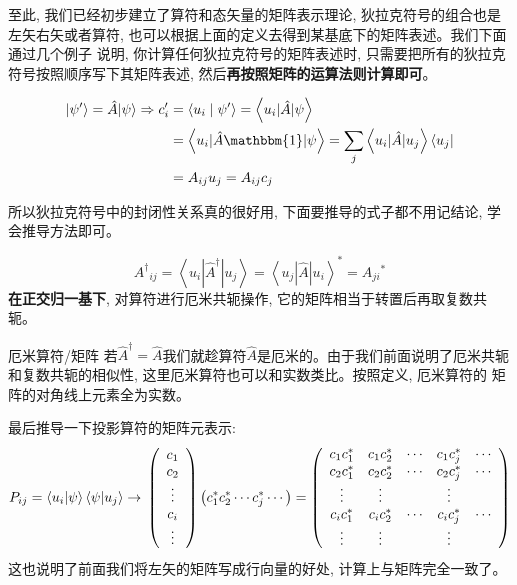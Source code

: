 至此, 我们已经初步建立了算符和态矢量的矩阵表示理论, 狄拉克符号的组合也是左矢右矢或者算符, 也可以根据上面的定义去得到某基底下的矩阵表述。我们下面通过几个例子
说明, 你计算任何狄拉克符号的矩阵表述时, 只需要把所有的狄拉克符号按照顺序写下其矩阵表述, 然后\textbf{再按照矩阵的运算法则计算即可}。

\begin{equation*}
    \begin{aligned}
        \left|\psi^{\prime}\right\rangle=\hat{A}|\psi\rangle \Rightarrow c_{i}^{\prime} &=\left\langle u_{i} \mid \psi^{\prime}\right\rangle=\left\langle u_{i}|\hat{A}| \psi\right\rangle \\
        &=\left\langle u_{i}|\hat{A} \mathbbm{1}| \psi\right\rangle=\sum_{j}\left\langle u_{i}|\hat{A}| u_{j}\right\rangle\left\langle u_{j}\right| \\
        &=A_{i j} u_{j}=A_{i j} c_{j}
    \end{aligned}
\end{equation*}
\begin{thinknote}
    所以狄拉克符号中的封闭性关系真的很好用, 下面要推导的式子都不用记结论, 学会推导方法即可。
\end{thinknote}
\begin{equation*}
    \boxed{
        A^{\dagger}{ }_{i j}=\left\langle u_{i}\left|\hat{A}^{\dagger}\right| u_{j}\right\rangle=\left\langle u_{j}|\hat{A}| u_{i}\right\rangle^{*}=A_{j i}{ }^{*}
    }
    \end{equation*}
\textbf{在正交归一基下}, 对算符进行厄米共轭操作, 它的矩阵相当于转置后再取复数共轭。
\begin{define}{厄米算符/矩阵}
    若$\hat{A}^\dagger=\hat{A}$我们就趁算符$\hat{A}$是厄米的。由于我们前面说明了厄米共轭和复数共轭的相似性, 这里厄米算符也可以和实数类比。按照定义, 厄米算符的
    矩阵的对角线上元素全为实数。
\end{define}
最后推导一下投影算符的矩阵元表示:
\begin{equation*}
    P_{ij} =\left\langle u_i|\psi\right\rangle\left\langle\psi| u_j \right\rangle\rightarrow\\
    \left(\begin{array}{c}
        c_{1} \\
        c_{2} \\
        \vdots \\
        c_{i} \\
        \vdots
        \end{array}\right)\left(c_{1}^{*} c_{2}^{*} \cdots c_{j}^{*} \cdots\right)=\left(\begin{array}{ccccc}
        c_{1} c_{1}^{*} & c_{1} c_{2}^{*} & \cdots & c_{1} c_{j}^{*} & \cdots \\
        c_{2} c_{1}^{*} & c_{2} c_{2}^{*} & \cdots & c_{2} c_{j}^{*} & \cdots \\
        \vdots & \vdots & & \vdots & \\
        c_{i} c_{1}^{*} & c_{i} c_{2}^{*} & \cdots & c_{i} c_{j}^{*} & \cdots \\
        \vdots & \vdots & & \vdots &
        \end{array}\right)
\end{equation*}
这也说明了前面我们将左矢的矩阵写成行向量的好处, 计算上与矩阵完全一致了。
